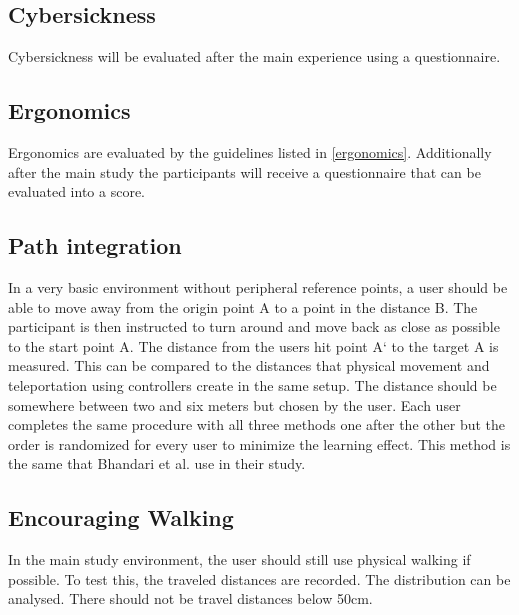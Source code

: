 \subsection{Cybersickness}
Cybersickness will be evaluated after the main experience using a questionnaire.


\subsection{Ergonomics}
Ergonomics are evaluated by the guidelines listed in \ref{ergonomics}. Additionally after the main study the participants will receive a questionnaire that can be evaluated into a score.


\subsection{Path integration}
In a very basic environment without peripheral reference points, a user should be able to move away from the origin point A to a point in the distance B. The participant is then instructed to turn around and move back as close as possible to the start point A. The distance from the users hit point A` to the target A is measured. This can be compared to the distances that physical movement and teleportation using controllers create in the same setup. The distance should be somewhere between two and six meters but chosen by the user. Each user completes the same procedure with all three methods one after the other but the order is randomized for every user to minimize the learning effect. This method is the same that Bhandari et al. \cite{Bhandari} use in their study.


\subsection{Encouraging Walking}
In the main study environment, the user should still use physical walking if possible. To test this, the traveled distances are recorded. The distribution can be analysed. There should not be travel distances below 50cm.
